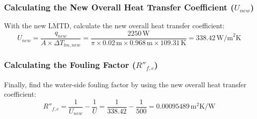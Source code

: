 \documentclass{article}
\numberwithin{equation}{section}
\begin{document}
\subsubsection*{Calculating the New Overall Heat Transfer Coefficient (\(U_{new}\))}
With the new LMTD, calculate the new overall heat transfer coefficient:
\begin{equation}
U_{new} = \frac{q_{new}}{A \times \Delta T_{lm,new}} = \frac{2250 \, \text{W}}{\pi \times 0.02 \, \text{m} \times 0.968 \, \text{m} \times 109.31 \, \text{K}} = 338.42 \, \text{W/m}^2\text{K}
\end{equation}

\subsubsection*{Calculating the Fouling Factor (\(R''_{f,c}\))}
Finally, find the water-side fouling factor by using the new overall heat transfer coefficient:
\begin{equation}
R''_{f,c} = \frac{1}{U_{new}} - \frac{1}{U} = \frac{1}{338.42} - \frac{1}{500} = 0.00095489 \, \text{m}^2\text{K/W}
\end{equation}
\end{document}
